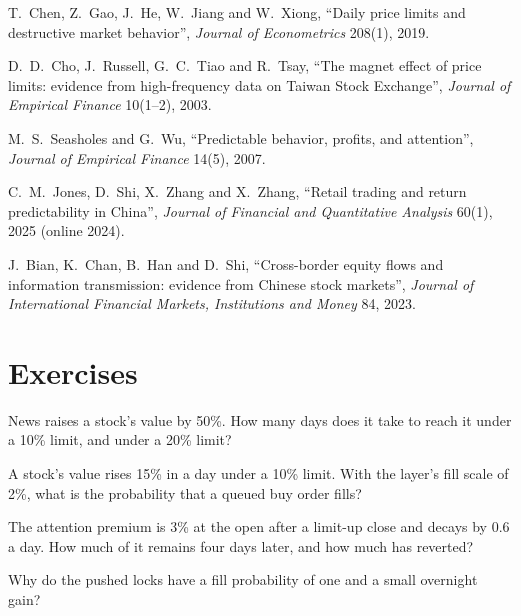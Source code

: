 \begin{omsources}
\item T.~Chen, Z.~Gao, J.~He, W.~Jiang and W.~Xiong, ``Daily price limits and destructive market behavior'', \emph{Journal of Econometrics} 208(1),
2019.
\item D.~D.~Cho, J.~Russell, G.~C.~Tiao and R.~Tsay, ``The magnet effect of price limits: evidence from high-frequency data on Taiwan Stock Exchange'',
\emph{Journal of Empirical Finance} 10(1--2), 2003.
\item M.~S.~Seasholes and G.~Wu, ``Predictable behavior, profits, and attention'', \emph{Journal of Empirical Finance} 14(5), 2007.
\item C.~M.~Jones, D.~Shi, X.~Zhang and X.~Zhang, ``Retail trading and return predictability in China'', \emph{Journal of Financial and Quantitative
Analysis} 60(1), 2025 (online 2024).
\item J.~Bian, K.~Chan, B.~Han and D.~Shi, ``Cross-border equity flows and information transmission: evidence from Chinese stock markets'',
\emph{Journal of International Financial Markets, Institutions and Money} 84, 2023.
\end{omsources}

\section{Exercises}

\begin{exercise}[$\star$]\label{exo:s1:asia-specific-equity-strategies:1}
News raises a stock's value by 50\%. How many days does it take to reach it under a 10\% limit, and under a 20\% limit?
\end{exercise}

\begin{exercise}[$\star$]\label{exo:s1:asia-specific-equity-strategies:2}
A stock's value rises 15\% in a day under a 10\% limit. With the layer's fill scale of 2\%, what is the probability that a queued buy order fills?
\end{exercise}

\begin{exercise}[$\star$]\label{exo:s1:asia-specific-equity-strategies:3}
The attention premium is 3\% at the open after a limit-up close and decays by 0.6 a day. How much of it remains four days later, and how much has
reverted?
\end{exercise}

\begin{exercise}[$\star\star$]\label{exo:s1:asia-specific-equity-strategies:4}
Why do the pushed locks have a fill probability of one and a small overnight gain?
\end{exercise}

